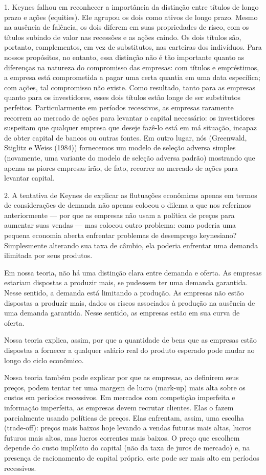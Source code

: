 \documentclass[12pt]{article}
\begin{document}
1. Keynes falhou em reconhecer a importância da distinção entre títulos de longo prazo e ações (equities). Ele agrupou os dois como ativos de longo prazo. Mesmo na ausência de falência, os dois diferem em suas propriedades de risco, com os títulos subindo de valor nas recessões e as ações caindo. Os dois títulos são, portanto, complementos, em vez de substitutos, nas carteiras dos indivíduos. Para nossos propósitos, no entanto, essa distinção não é tão importante quanto as diferenças na natureza do compromisso das empresas: com títulos e empréstimos, a empresa está comprometida a pagar uma certa quantia em uma data específica; com ações, tal compromisso não existe. Como resultado, tanto para as empresas quanto para os investidores, esses dois títulos estão longe de ser substitutos perfeitos. Particularmente em períodos recessivos, as empresas raramente recorrem ao mercado de ações para levantar o capital necessário: os investidores suspeitam que qualquer empresa que deseje fazê-lo está em má situação, incapaz de obter capital de bancos ou outras fontes. Em outro lugar, nós (Greenwald, Stiglitz e Weiss (1984)) fornecemos um modelo de seleção adversa simples (novamente, uma variante do modelo de seleção adversa padrão) mostrando que apenas as piores empresas irão, de fato, recorrer ao mercado de ações para levantar capital.

2. A tentativa de Keynes de explicar as flutuações econômicas apenas em termos de considerações de demanda não apenas colocou o dilema a que nos referimos anteriormente — por que as empresas não usam a política de preços para aumentar suas vendas — mas colocou outro problema: como poderia uma pequena economia aberta enfrentar problemas de desemprego keynesiano? Simplesmente alterando sua taxa de câmbio, ela poderia enfrentar uma demanda ilimitada por seus produtos.

Em nossa teoria, não há uma distinção clara entre demanda e oferta. As empresas estariam dispostas a produzir mais, se pudessem ter uma demanda garantida. Nesse sentido, a demanda está limitando a produção. As empresas não estão dispostas a produzir mais, dados os riscos associados à produção na ausência de uma demanda garantida. Nesse sentido, as empresas estão em sua curva de oferta.

Nossa teoria explica, assim, por que a quantidade de bens que as empresas estão dispostas a fornecer a qualquer salário real do produto esperado pode mudar ao longo do ciclo econômico.

Nossa teoria também pode explicar por que as empresas, ao definirem seus preços, podem tentar ter uma margem de lucro (mark-up) mais alta sobre os custos em períodos recessivos. Em mercados com competição imperfeita e informação imperfeita, as empresas devem recrutar clientes. Elas o fazem parcialmente usando políticas de preços. Elas enfrentam, assim, uma escolha (trade-off): preços mais baixos hoje levando a vendas futuras mais altas, lucros futuros mais altos, mas lucros correntes mais baixos. O preço que escolhem depende do custo implícito do capital (não da taxa de juros de mercado) e, na presença de racionamento de capital próprio, este pode ser mais alto em períodos recessivos.
\end{document}
